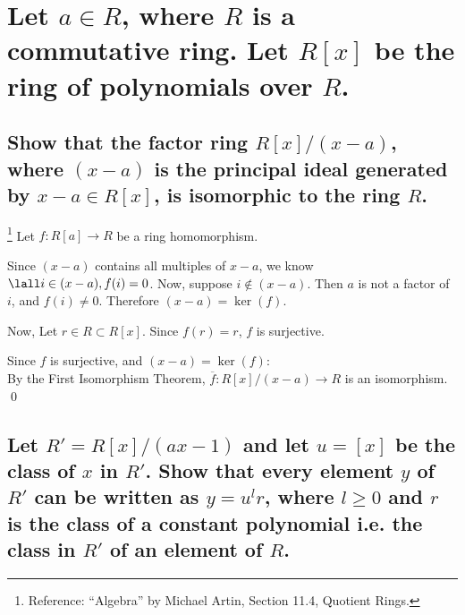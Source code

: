 \section[Problem 2]{Let $a \in R$, where $R$ is a commutative ring.
    Let $R[x]$ be the ring of polynomials over $R$.}
    \subsection[(i)]{Show that the factor ring $R[x]/(x-a)$, where $(x-a)$ is the principal
        ideal generated by $x-a\in R[x]$, is isomorphic to the ring $R$.
    }
        \footnote{Reference: “Algebra” by Michael Artin, Section 11.4, Quotient Rings.}
        Let $f: R[a] \to R$ be a ring homomorphism.

        Since $(x-a)$ contains all multiples of $x - a$,
        we know $\lall i \in (x-a), f(i) = 0$.
        Now, suppose $i \not\in (x-a)$. 
        Then $a$ is not a factor of $i$, and $f(i) \neq 0$.
        Therefore $(x-a) = \ker(f)$.

        Now, Let $r \in R \subset R[x]$.
        Since $f(r) = r$, $f$ is surjective.

        Since $f$ is surjective, and $(x-a) = \ker(f)$: \\
        By the First Isomorphism Theorem, $\overline{f}: R[x] / (x-a) \to R$ is an isomorphism.
        \qed


    \subsection[(ii)]{Let $R' = R[x]/(ax-1)$ and let $u = [x]$ be the class of $x$ in $R'$.
        Show that every element $y$ of $R'$ can be written as $y = u^lr$, where $l \geq 0$
        and $r$ is the class of a constant polynomial i.e. the class in $R'$ of an element 
        of $R$.}




